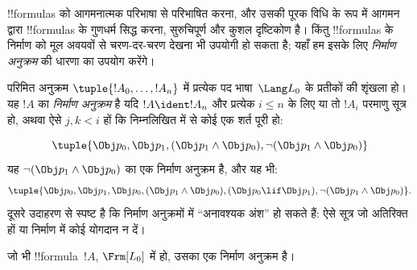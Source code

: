 \documentclass[../../../include/open-logic-section]{subfiles}
\begin{document}


!!{formula}s को आगमनात्मक परिभाषा से परिभाषित करना, और उसकी पूरक विधि के
रूप में आगमन द्वारा !!{formula}s के गुणधर्म सिद्ध करना, सुरुचिपूर्ण और कुशल
दृष्टिकोण है। किंतु !!{formula}s के निर्माण को मूल अवयवों से चरण-दर-चरण
देखना भी उपयोगी हो सकता है; यहाँ हम इसके लिए \emph{निर्माण अनुक्रम} की
धारणा का उपयोग करेंगे।

\begin{defn}[सूत्रों के निर्माण अनुक्रम]
परिमित अनुक्रम $\tuple{!A_0,\dotsc,!A_n}$ में प्रत्येक पद भाषा~$\Lang L_0$
के प्रतीकों की शृंखला हो। यह $!A$ का \emph{निर्माण अनुक्रम} है यदि
$!A \ident !A_n$ और प्रत्येक $i \leq n$ के लिए या तो $!A_i$ परमाणु सूत्र
हो, अथवा ऐसे $j,k < i$ हों कि निम्नलिखित में से कोई एक शर्त पूरी हो:
\begin{enumerate}
\end{enumerate}
\end{defn}

\begin{ex}
\[
\tuple{
    \Obj p_0,
    \Obj p_1,
    (\Obj p_1 \land \Obj p_0),
    \lnot (\Obj p_1 \land \Obj p_0)
}
\]
यह $\lnot (\Obj p_1 \land \Obj p_0)$ का एक निर्माण अनुक्रम है, और यह भी:
\[
\tuple{
    \Obj p_0,
    \Obj p_1,
    \Obj p_0,
    (\Obj p_1 \land \Obj p_0),
    (\Obj p_0 \lif \Obj p_1),
    \lnot (\Obj p_1 \land \Obj p_0)
}.
\]
%
दूसरे उदाहरण से स्पष्ट है कि निर्माण अनुक्रमों में ``अनावश्यक अंश'' हो सकते
हैं: ऐसे सूत्र जो अतिरिक्त हों या निर्माण में कोई योगदान न दें।
\end{ex}

\begin{prop}
जो भी !!{formula}~$!A$, $\Frm[L_0]$ में हो, उसका एक निर्माण अनुक्रम है।
\end{prop}
\end{document}
